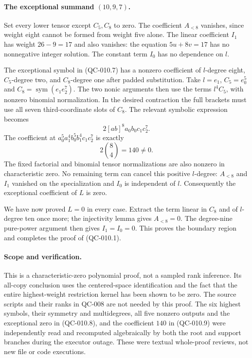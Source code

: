 \paragraph{The exceptional summand $(10,9,7)$.}
Set every lower tensor except $C_5,C_8$ to zero.
The coefficient $A_{<8}$ vanishes, since weight eight
cannot be formed from weight five alone. The linear
coefficient $I_1$ has weight $26-9=17$ and also vanishes:
the equation $5u+8v=17$ has no nonnegative integer
solution. The constant term $I_0$ has no dependence
on $l$.

The exceptional symbol in (QC-010.7) has a nonzero
coefficient of $l$-degree eight, $C_5$-degree two,
and $C_8$-degree one after padded substitution.
Take $l=e_1$, $C_5=e_0^5$ and
$C_8=\operatorname{sym}(e_1e_2^7)$.
The two nonic arguments then use the terms
$l^4C_5$, with nonzero binomial normalization.
In the desired contraction the full brackets must
use all seven third-coordinate slots of $C_8$.
The relevant symbolic expression becomes
\[
  2[a b]^8a_0b_0c_1c_2^7.
\]
The coefficient at
$a_0^5a_1^4b_0^5b_1^4c_1c_2^7$ is exactly
\[
               2\binom84=140\ne0.
 \tag{QC-010.9}
\]
The fixed factorial and binomial tensor normalizations
are also nonzero in characteristic zero.
No remaining term can cancel this positive $l$-degree:
$A_{<8}$ and $I_1$ vanished on the specialization and
$I_0$ is independent of $l$. Consequently the
exceptional coefficient of $L$ is zero.

We have now proved $L=0$ in every case. Extract the
term linear in $C_8$ and of $l$-degree ten once more;
the injectivity lemma gives $A_{<8}=0$.
The degree-nine pure-power argument then gives
$I_1=I_0=0$. This proves the boundary region
and completes the proof of (QC-010.1).

\paragraph{Scope and verification.}
This is a characteristic-zero polynomial proof, not
a sampled rank inference. Its all-copy conclusion
uses the centered-space identification and the fact
that the entire highest-weight restriction kernel
has been shown to be zero. The source scripts and
their ranks in QC-008 are not needed by this proof.
The six highest symbols, their symmetry and
multidegrees, all five nonzero outputs and the
exceptional zero in (QC-010.8), and the coefficient
$140$ in (QC-010.9) were independently read and
recomputed algebraically by both the root and
support branches during the executor outage.
These were textual whole-proof reviews, not
new file or code executions.

